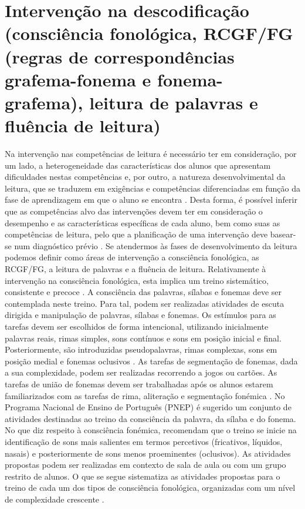\documentclass[
  oneside,
  11pt, a4paper,
  footinclude=true,
  headinclude=true,
  cleardoublepage=empty
]{scrbook}
\begin{document}
\section{Intervenção na descodificação (consciência fonológica, RCGF/FG (regras de correspondências grafema-fonema e fonema-grafema), leitura de palavras e fluência de leitura)}
Na intervenção nas competências de leitura é necessário ter em consideração, por um lado, a heterogeneidade das características dos alunos que apresentam dificuldades nestas competências e, por outro, a natureza desenvolvimental da leitura, que se traduzem em exigências e competências diferenciadas em função da fase de aprendizagem em que o aluno se encontra \citep{Alexander}. Desta forma, é possível inferir que as competências alvo das intervenções devem ter em consideração o desempenho e as características específicas de cada aluno, bem como suas as competências de leitura, pelo que a planificação de uma intervenção deve basear-se num diagnóstico prévio \citep{Bermejo}. Se atendermos às fases de desenvolvimento da leitura podemos definir como áreas de intervenção a consciência fonológica, as RCGF/FG, a leitura de palavras e a fluência de leitura.
Relativamente à intervenção na consciência fonológica, esta implica um treino sistemático, consistente e precoce \citep{Freitas}. A consciência das palavras, sílabas e fonemas deve ser contemplada neste treino. Para tal, podem ser realizadas atividades de escuta dirigida e manipulação de palavras, sílabas e fonemas. Os estímulos para as tarefas devem ser escolhidos de forma intencional, utilizando inicialmente palavras reais, rimas simples, sons contínuos e sons em posição inicial e final. Posteriormente, são introduzidas pseudopalavras, rimas complexas, sons em posição medial e fonemas oclusivos \citep{Goldsworthy}. As tarefas de segmentação de fonemas, dada a sua complexidade, podem ser realizadas recorrendo a jogos ou cartões. As tarefas de união de fonemas devem ser trabalhadas após os alunos estarem familiarizados com as tarefas de rima, aliteração e segmentação fonémica \citep{Castle}.
No Programa Nacional de Ensino de Português (PNEP) é sugerido um conjunto de atividades destinadas ao treino da consciência da palavra, da sílaba e do fonema. No que diz respeito à consciência fonémica, recomendam que o treino se inicie na identificação de sons mais salientes em termos percetivos (fricativos, líquidos, nasais) e posteriormente de sons menos proeminentes (oclusivos). As atividades propostas podem ser realizadas em contexto de sala de aula ou com um grupo restrito de alunos. O que se segue sistematiza as atividades propostas para o treino de cada um dos tipos de consciência fonológica, organizadas com um nível de complexidade crescente \citep{Freitas}.
\end{document}
